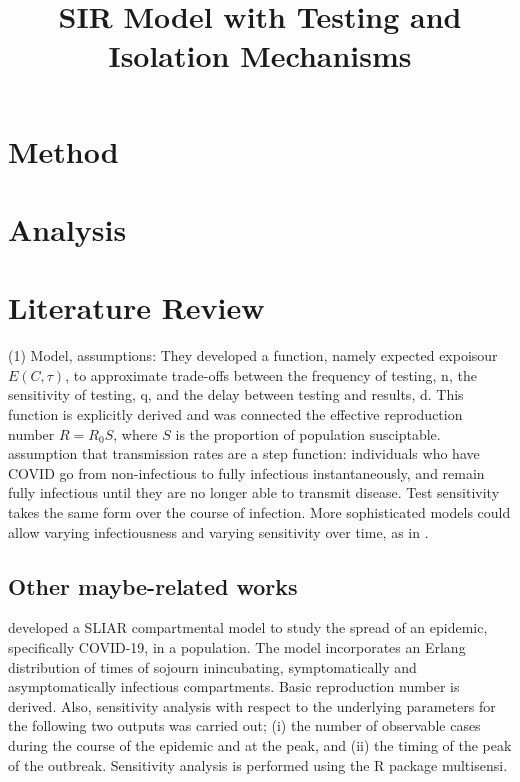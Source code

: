 \documentclass{article}\usepackage[]{graphicx}\usepackage[]{color}
\title{SIR Model with Testing and Isolation Mechanisms}
\begin{document}
\maketitle

\section{Method}


\section{Analysis}
    

\section{Literature Review}
\cite{bergstrom2020frequency}
(1) Model, assumptions: They developed a function, namely expected expoisour $E(C,\tau)$, to approximate trade-offs between the frequency of testing, n, the sensitivity of testing, q, and the delay between
testing and results, d. This function is explicitly derived and was connected the effective reproduction number $R=R_0 S$, where $S$ is the proportion of population susciptable.
assumption that transmission rates are a step function: individuals who
have COVID go from non-infectious to fully infectious instantaneously,
and remain fully infectious until they are no longer able to transmit disease. Test sensitivity takes the same form over the course of infection.
More sophisticated models could allow varying infectiousness and varying
sensitivity over time, as in 
\citep{larremore2020test}.


\subsection{Other maybe-related works}
\citep{arino2020simple} developed a SLIAR compartmental model to study the spread of an epidemic, specifically COVID-19, in a population. The model incorporates an Erlang distribution of times of sojourn inincubating, symptomatically and asymptomatically infectious compartments. Basic reproduction number is derived. Also, sensitivity analysis with respect to the underlying parameters for the following two outputs was carried out; (i) the number of observable cases during the course of the epidemic and at the peak, and (ii) the timing of the peak of the outbreak. Sensitivity analysis is performed using the R package multisensi.


\end{document}

